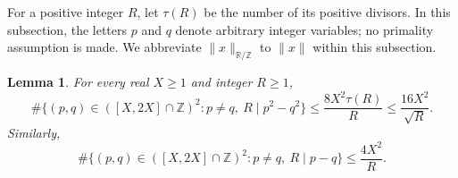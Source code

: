 \documentclass[twoside]{aomart}
\theoremstyle{paperplain}
\newtheorem{lemma}[theorem]{Lemma}
\theoremstyle{paperdefinition}
\newcommand{\Z}{\mathbb Z}
\newcommand{\R}{\mathbb R}
\numberwithin{equation}{section}
\begin{document}
For a positive integer $R$, let $\tau(R)$ be the number of its
positive divisors. In this subsection, the letters $p$ and $q$
denote arbitrary integer variables; no primality assumption is made.
We abbreviate $\|x\|_{\R/\Z}$ to $\|x\|$ within this subsection.

\begin{lemma}\label{sc:congruence-counts}
For every real $X\ge1$ and integer $R\ge1$,
\begin{equation}
 \#\{(p,q)\in([X,2X]\cap\mathbb Z)^2:p\ne q,
                  \ R\mid p^2-q^2\}
 \le\frac{8X^2\tau(R)}R\le\frac{16X^2}{\sqrt R}.
 \label{sc:dense-square-count}
\end{equation}
Similarly,
\begin{equation}
 \#\{(p,q)\in([X,2X]\cap\mathbb Z)^2:p\ne q,
                  \ R\mid p-q\}\le\frac{4X^2}{R}.
 \label{sc:dense-linear-count}
\end{equation}
\end{lemma}
\end{document}
